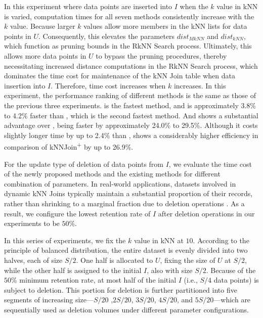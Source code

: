 
In this experiment where data points are inserted into $I$ when the $k$ value in kNN is varied, computation times for all seven methods consistently increase with the $k$ value. Because larger $k$ values allow more members in the kNN lists for data points in $U$. Consequently, this elevates the parameters $dist_{MkNN}$ and $dist_{kNN}$, which function as pruning bounds in the RkNN Search process. Ultimately, this allows more data points in $U$ to bypass the pruning procedures, thereby necessitating increased distance computations in the RkNN Search process, which dominates the time cost for maintenance of the kNN Join table when data insertion into $I$. Therefore, time cost increases when $k$ increases.    
In this experiment, the performance ranking of different methods is the same as those of the previous three experiments. \cpdualtree is the fastest method, and is approximately 3.8\% to 4.2\% faster than \spdualtree, which is the second fastest method. And \spdualtree shows a substantial advantage over \hdrtree, being faster by approximately 24.0\% to 29.5\%. Although it costs slightly longer time by up to 2.4\% than \hdrtree, \dualtree shows a considerably higher efficiency in comparison of kNNJoin\textsuperscript{+} by up to 26.9\%.



For the update type of deletion of data points from $I$, we evaluate the time cost of the newly proposed methods and the existing methods for different combination of parameters. In real-world applications, datasets involved in dynamic kNN Joins typically maintain a substantial proportion of their records, rather than shrinking to a marginal fraction due to deletion operations \cite{dong2021rocksdb, zhang2016dl, zhou2022autoindex}. As a result, we configure the lowest retention rate of $I$ after deletion operations in our experiments to be $50\%$.  

 In this series of experiments, we fix the $k$ value in kNN at $10$. According to the principle of balanced distribution, the entire dataset is evenly divided into two halves, each of size $S/2$. One half is allocated to $U$, fixing the size of $U$ at $S/2$, while the other half is assigned to the initial $I$, also with size $S/2$. Because of the $50\%$ minimum retention rate, at most half of the initial $I$ (i.e., $S/4$ data points) is subject to deletion. This portion for deletion is further partitioned into five segments of increasing size—$S/20$ ,$2S/20$, $3S/20$, $4S/20$, and $5S/20$—which are sequentially used as deletion volumes under different parameter configurations.  


